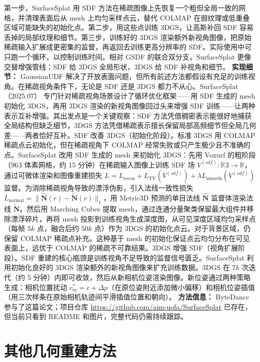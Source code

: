 第一步，SurfaceSplat 用 SDF 方法在稀疏图像上先恢复一个粗但全局一致的网格，并清理表面后从 mesh 上均匀采样点云，替代 COLMAP 在弱纹理或低重叠区域可能缺失的初始化点。第二步，用这些点训练 3DGS，让高斯补回 SDF 容易丢掉的局部纹理和细节。第三步，训练好的 3DGS 渲染额外新视角图像，把原始稀疏输入扩展成更密集的监督，再返回去训练更高分辨率的 SDF。实际使用中可只跑一个循环，以控制训练时间。相对 GSDF 的联合双分支，SurfaceSplat 更像交替增强管线：SDF 给 3DGS 全局形状，3DGS 给 SDF 补视角和细节。
\textbf{实现细节：} GaussianUDF 解决了开放表面问题，但所有前述方法都假设有充足的训练视角。在稀疏视角条件下，无论是 SDF 还是 3DGS 都力不从心。SurfaceSplat（2025.07） 专门针对稀疏视角场景设计了循环优化框架——用 SDF 生成的 mesh 初始化 3DGS，再用 3DGS 渲染的新视角图像回过头来增强 SDF 训练——让两种表示互补增强。其出发点是一个关键观察：SDF 方法凭借稠密表示能很好地捕获全局结构但缺乏细节，3DGS 方法凭借稀疏表示擅长保留局部高频细节但全局几何差——两者恰好互补。SDF 改善 3DGS（初始化阶段）。标准 3DGS 用 COLMAP 稀疏点云初始化，但在稀疏视角下 COLMAP 经常失败或只产生极少且不准确的点。SurfaceSplat 改用 SDF 生成的 mesh 来初始化 3DGS：先用 Voxurf 的粗阶段（$96^{}3$ 体素网格，约 15 分钟）在稀疏输入图像上训练 SDF 场 $V^{(sdf)}: \mathbb{R}^{}3 \to \mathbb{R}$，通过可微体渲染和图像重建损失 $L = L_{\mathrm{recon}} + L_{\mathrm{TV}}(V^{(sdf)}) + \lambda L_{\mathrm{smooth}}(V^{(sdf)})$ 监督。为消除稀疏视角导致的漂浮伪影，引入法线一致性损失 $L_{\mathrm{normal}} = \|\hat{\mathbf{N}}(r) - \tilde{\mathbf{N}}(r)\|_1$，用 Metric3D 预测的单目法线 $\hat{\mathbf{N}}$ 监督体渲染法线 $\tilde{\mathbf{N}}$。然后用 Marching Cubes 提取 mesh，通过连通分量聚类保留最大组件并移除漂浮碎片，再将 mesh 投影到训练视角生成深度图，从可见深度区域均匀采样点（每帧 $5k$ 点，融合后约 $50k$ 点）作为 3DGS 的初始化点云。对于背景区域，仍保留 COLMAP 稀疏点补充。这种基于 mesh 的初始化保证点云均匀分布在可见表面上，远优于 COLMAP 的稀疏不可靠结果。3DGS 增强 SDF（视角扩展阶段）。SDF 重建的核心瓶颈是训练视角不足导致的监督信号匮乏。SurfaceSplat 利用初始化良好的 3DGS 渲染额外的新视角图像来扩充训练数据。3DGS 在 $7k$ 次迭代（约 5 分钟）内即可收敛，然后从新相机位姿渲染图像。新位姿通过两种策略生成：相机位置扰动 $c_m^{*} = c + \Delta p$（在原位姿附近添加微小偏移）和相机位姿插值（用三次样条在原始相机轨迹间平滑插值位置和朝向）。
\textbf{方法信息：} ByteDance 参与了这篇论文；项目仓库 \url{https://github.com/aim-uofa/SurfaceSplat} 已存在，但当前只看到 README 和图片，完整代码仍需持续跟踪。



\section{其他几何重建方法}

